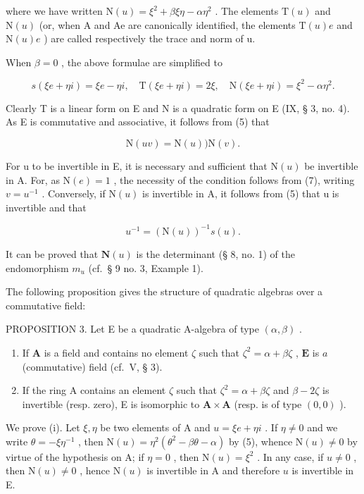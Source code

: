 where we have written \(\mathrm{N}(u)=\xi^{2}+\beta\xi\eta-\alpha\eta^{2}\) . The elements \(\mathrm{T}(u)\) and \(\mathrm{N}(u)\) (or, when A and Ae are canonically identified, the elements \(\mathrm{T}(u)e\) and \(\mathrm{N}(u)e\) ) are called respectively the trace and norm of u.

When \(\beta = 0\) , the above formulae are simplified to

\[
s (\xi e + \eta i) = \xi e - \eta i, \quad \mathrm{T} (\xi e + \eta i) = 2 \xi , \quad \mathrm{N} (\xi e + \eta i) = \xi^ {2} - \alpha \eta^ {2}. \tag {6}
\]

Clearly T is a linear form on E and N is a quadratic form on E (IX, § 3, no. 4). As E is commutative and associative, it follows from (5) that

\[
\mathrm{N} (u v) = \mathrm{N} (u)) \mathrm{N} (v).\tag{7}
\]

For u to be invertible in E, it is necessary and sufficient that \(\mathrm{N}(u)\) be invertible in A. For, as \(\mathrm{N}(e)=1\) , the necessity of the condition follows from (7), writing \(v=u^{-1}\) . Conversely, if \(\mathrm{N}(u)\) is invertible in A, it follows from (5) that u is invertible and that

\[
u ^ {- 1} = (\mathrm{N} (u)) ^ {- 1} s (u).\tag{8}
\]

It can be proved that \(\mathbf{N}(u)\) is the determinant (§ 8, no. 1) of the endomorphism \(m_u\) (cf.~§ 9 no. 3, Example 1).

The following proposition gives the structure of quadratic algebras over a commutative field:

PROPOSITION 3. Let E be a quadratic A-algebra of type \((\alpha, \beta)\) .

\begin{enumerate}
\def\labelenumi{(\roman{enumi})}
\item
  If \(\mathbf{A}\) is a field and contains no element \(\zeta\) such that \(\zeta^2 = \alpha + \beta \zeta\) , \(\mathbf{E}\) is \(a\) (commutative) field (cf.~V, § 3).
\item
  If the ring A contains an element \(\zeta\) such that \(\zeta^2 = \alpha + \beta\zeta\) and \(\beta - 2\zeta\) is invertible (resp. zero), E is isomorphic to \(\mathbf{A} \times \mathbf{A}\) (resp. is of type \((0,0)\) ).
\end{enumerate}

We prove (i). Let \(\xi, \eta\) be two elements of A and \(u = \xi e + \eta i\) . If \(\eta \neq 0\) and we write \(\theta = -\xi \eta^{-1}\) , then \(\mathrm{N}(u) = \eta^2 (\theta^2 - \beta \theta - \alpha)\) by (5), whence \(\mathrm{N}(u) \neq 0\) by virtue of the hypothesis on A; if \(\eta = 0\) , then \(\mathrm{N}(u) = \xi^2\) . In any case, if \(u \neq 0\) , then \(\mathrm{N}(u) \neq 0\) , hence \(\mathrm{N}(u)\) is invertible in A and therefore \(u\) is invertible in E.

